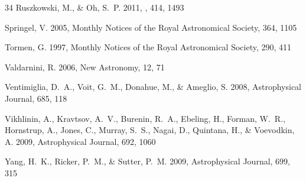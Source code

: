 \documentclass[12pt,preprint]{aastex}
\begin{document}
\begin{thebibliography}{34}
{Ruszkowski}, M., \& {Oh}, S.~P. 2011, \apj, 414, 1493

Springel, V. 2005, Monthly Notices of the Royal Astronomical Society, 364, 1105

Tormen, G. 1997, Monthly Notices of the Royal Astronomical Society, 290, 411

Valdarnini, R. 2006, New Astronomy, 12, 71

Ventimiglia, D.~A., Voit, G.~M., Donahue, M., \& Ameglio, S. 2008,
  Astrophysical Journal, 685, 118

Vikhlinin, A., Kravtsov, A.~V., Burenin, R.~A., Ebeling, H., Forman, W.~R.,
  Hornstrup, A., Jones, C., Murray, S.~S., Nagai, D., Quintana, H., \&
  Voevodkin, A. 2009, Astrophysical Journal, 692, 1060

Yang, H.~K., Ricker, P.~M., \& Sutter, P.~M. 2009, Astrophysical Journal, 699,
  315

\end{thebibliography}
\end{document}
